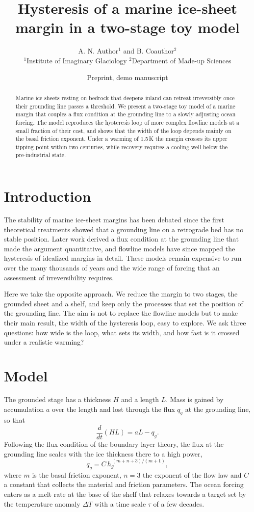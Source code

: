 \documentclass[11pt]{article}
\title{Hysteresis of a marine ice-sheet margin in a two-stage toy model}
\author{A. N. Author$^{1}$ and B. Coauthor$^{2}$\\[2pt]
\small $^1$Institute of Imaginary Glaciology \quad $^2$Department of Made-up Sciences}
\date{Preprint, demo manuscript}
\begin{document}
\maketitle
\begin{abstract}
Marine ice sheets resting on bedrock that deepens inland can retreat irreversibly once their grounding line passes a
threshold. We present a two-stage toy model of a marine margin that couples a flux condition at the grounding line to
a slowly adjusting ocean forcing. The model reproduces the hysteresis loop of more complex flowline models at a small
fraction of their cost, and shows that the width of the loop depends mainly on the basal friction exponent. Under a
warming of 1.5\,K the margin crosses its upper tipping point within two centuries, while recovery requires a cooling
well below the pre-industrial state.
\end{abstract}

\section{Introduction}
The stability of marine ice-sheet margins has been debated since the first theoretical treatments showed that a
grounding line on a retrograde bed has no stable position. Later work derived a flux condition at the grounding line
that made the argument quantitative, and flowline models have since mapped the hysteresis of idealized margins in
detail. These models remain expensive to run over the many thousands of years and the wide range of forcing that an
assessment of irreversibility requires.

Here we take the opposite approach. We reduce the margin to two stages, the grounded sheet and a shelf, and keep only
the processes that set the position of the grounding line. The aim is not to replace the flowline models but to make
their main result, the width of the hysteresis loop, easy to explore. We ask three questions: how wide is the loop,
what sets its width, and how fast is it crossed under a realistic warming?

\section{Model}
The grounded stage has a thickness $H$ and a length $L$. Mass is gained by accumulation $a$ over the length and lost
through the flux $q_g$ at the grounding line, so that
\begin{equation}
  \frac{d}{dt}(H L) = a L - q_g .
\end{equation}
Following the flux condition of the boundary-layer theory, the flux at the grounding line scales with the ice
thickness there to a high power,
\begin{equation}
  q_g = C\, h_g^{\,(m+n+3)/(m+1)} ,
\end{equation}
where $m$ is the basal friction exponent, $n=3$ the exponent of the flow law and $C$ a constant that collects the
material and friction parameters. The ocean forcing enters as a melt rate at the base of the shelf that relaxes
towards a target set by the temperature anomaly $\Delta T$ with a time scale $\tau$ of a few decades.
\end{document}

